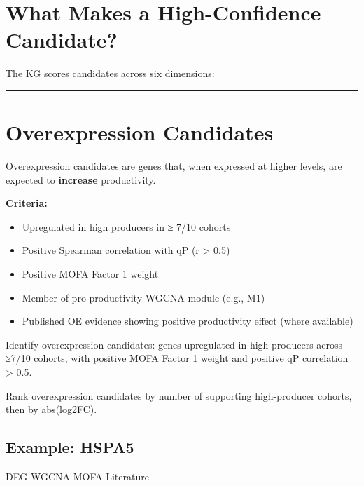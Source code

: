 \documentclass[
  letterpaper,
  oneside,
  open=any]{scrbook}
\providecommand{\tightlist}{%
  \setlength{\itemsep}{0pt}\setlength{\parskip}{0pt}}
\begin{document}
\section{What Makes a High-Confidence
Candidate?}\label{what-makes-a-high-confidence-candidate}

The KG scores candidates across six dimensions:

\begin{center}\rule{0.5\linewidth}{0.5pt}\end{center}

\section{Overexpression Candidates}\label{overexpression-candidates}

Overexpression candidates are genes that, when expressed at higher
levels, are expected to \textbf{increase} productivity.

\textbf{Criteria:}

\begin{itemize}
\tightlist
\item
  Upregulated in high producers in ≥ 7/10 cohorts
\item
  Positive Spearman correlation with qP (r \textgreater{} 0.5)
\item
  Positive MOFA Factor 1 weight
\item
  Member of pro-productivity WGCNA module (e.g., M1)
\item
  Published OE evidence showing positive productivity effect (where
  available)
\end{itemize}

Identify overexpression candidates: genes upregulated in high producers
across ≥7/10 cohorts, with positive MOFA Factor 1 weight and positive qP
correlation \textgreater{} 0.5.

Rank overexpression candidates by number of supporting high-producer
cohorts, then by abs(log2FC).

\subsection{Example: HSPA5}\label{example-hspa5}

{DEG} {WGCNA} {MOFA} {Literature}
\end{document}
